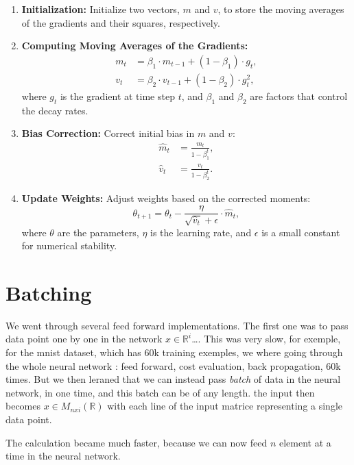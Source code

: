 \documentclass[a4paper, twocolumn, twoside]{article}
\begin{document}
	\begin{enumerate}
	  \item \textbf{Initialization:} Initialize two vectors, $m$ and $v$, to store the moving averages of the gradients and their squares, respectively.
	  \item \textbf{Computing Moving Averages of the Gradients:}
		\begin{align*}
		  m_t &= \beta_1 \cdot m_{t-1} + (1 - \beta_1) \cdot g_t, \\
		  v_t &= \beta_2 \cdot v_{t-1} + (1 - \beta_2) \cdot g_t^2,
		\end{align*}
		where $g_t$ is the gradient at time step $t$, and $\beta_1$ and $\beta_2$ are factors that control the decay rates.
	  \item \textbf{Bias Correction:} Correct initial bias in $m$ and $v$:
		\begin{align*}
		  \hat{m}_t &= \frac{m_t}{1 - \beta_1^t}, \\
		  \hat{v}_t &= \frac{v_t}{1 - \beta_2^t}.
		\end{align*}
	  \item \textbf{Update Weights:} Adjust weights based on the corrected moments:
		\begin{equation*}
		  \theta_{t+1} = \theta_t - \frac{\eta}{\sqrt{\hat{v}_t} + \epsilon} \cdot \hat{m}_t,
		\end{equation*}
		where $\theta$ are the parameters, $\eta$ is the learning rate, and $\epsilon$ is a small constant for numerical stability.
	\end{enumerate}

	\section{Batching}
	We went through several feed forward implementations. The first one was to pass data point one by one in the network
	$x \in \mathbb{R}^{i}$\dots. This was very slow, for exemple, for the mnist dataset, which has 60k training exemples,
	we where going through the whole neural network : feed forward, cost evaluation, back propagation, 60k times.
	But we then leraned that we can instead pass \textit{batch} of data in the neural network, in one time, and this batch can
	be of any length.
	the input then becomes $x \in M_{nxi} (\mathbb{R})$ with each line of the input matrice representing a single data point.

	The calculation became much faster, because we can now feed $n$ element at a time in the neural network.
\end{document}
